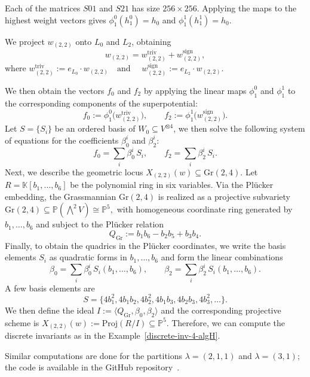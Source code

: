 \documentclass{amsart}
\begin{document}
Each of the matrices $S01$ and $S21$ has size  $256 \times 256$. Applying the maps to the highest weight vectors gives $\phi_1^0(h_1^0) = h_0$ and  $\phi_1^1(h_1^1) = h_0.$

We project \(w_{(2,2)}\) onto \(L_0\) and \(L_2\), obtaining
$$w_{(2,2)} = w_{(2,2)}^{\mathrm{triv}} + w_{(2,2)}^{\mathrm{sign}},$$
where 
$w_{(2,2)}^{\mathrm{triv}} := e_{L_{0}} \cdot w_{(2,2)} \quad \text{and } \quad
w_{(2,2)}^{\mathrm{sign}} := e_{L_{2}} \cdot w_{(2,2)}.$

We then obtain the vectors $f_0$ and $f_2$ by applying the linear maps $\phi_1^0$ and $\phi_1^1$ to the corresponding components of the superpotential:
$$f_0 := \phi_1^0\big(w_{(2,2)}^{\mathrm{triv}}\big), \qquad
f_2 := \phi_1^1\big(w_{(2,2)}^{\mathrm{sign}}\big).$$
Let $S = \{S_i\}$ be an ordered basis of $W_0 \subseteq V^{\otimes 4}$, we then solve the following system of equations for the coefficients $\beta_0^i$ and $\beta_2^i$:
$$ f_0 = \sum_i \beta_0^i \, S_i, \qquad f_2 = \sum_i \beta_2^i \, S_i.$$
Next, we describe the geometric locus $X_{(2,2)}(w) \subseteq \mathrm{Gr}(2,4).$
Let $R = \mathbb{K}[b_1, \dots, b_6]$ be the polynomial ring in six variables. Via the Plücker embedding, the Grassmannian $\mathrm{Gr}(2,4)$ is realized as a projective subvariety $ \mathrm{Gr}(2,4) \subseteq \mathbb{P}(\bigwedge^2 V) \cong \mathbb{P}^5,$
with homogeneous coordinate ring generated by $b_1, \dots, b_6$ and subject to the Plücker relation
$$Q_{\mathrm{Gr}} := b_1 b_6 - b_2 b_5 + b_3 b_4.$$
Finally, to obtain the quadrics in the Plücker coordinates, we write the basis elements $S_i$ as quadratic forms in $b_1, \dots, b_6$ and form the linear combinations
\[
\beta_0 = \sum_i \beta_0^i \, S_i(b_1,\dots,b_6), \qquad
\beta_2 = \sum_i \beta_2^i \, S_i(b_1,\dots,b_6).
\]
A few basis elements are
\[
S = \{4 b_1^2, 4 b_1 b_2, 4 b_2^2, 4 b_1 b_3, 4 b_2 b_3, 4 b_3^2,  \dots \}.
\]
We then define the ideal
$I := \langle Q_{\mathrm{Gr}}, \beta_0, \beta_2 \rangle$ and the corresponding projective scheme is
$X_{(2,2)}(w) := \mathrm{Proj}(R/I) \subseteq \mathbb{P}^5.$ Therefore, we can compute the discrete invariants as in the Example~\ref{discrete-inv-4-algH}.

Similar computations are done for the partitions $\lambda = (2,1,1)$ and $\lambda = (3,1)$; the code is available in the GitHub repository~\cite{vishal2025}.
\end{document}
